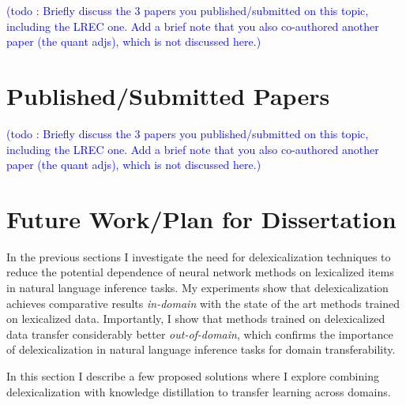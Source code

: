 \documentclass{article}
\newcommand\todo[1]{\textcolor{blue}{(todo : #1)}}
\begin{document}
\todo{Briefly discuss the 3 papers you published/submitted on this topic, including the LREC one. Add a brief note that you also co-authored another paper (the quant adjs), which is not discussed here.}

\section{Published/Submitted Papers}

\todo{Briefly discuss the 3 papers you published/submitted on this topic, including the LREC one. Add a brief note that you also co-authored another paper (the quant adjs), which is not discussed here.}

 
\section{Future Work/Plan for Dissertation}
In the previous sections I investigate the need for delexicalization techniques to reduce the potential dependence of neural network methods on lexicalized items in natural language inference tasks. My experiments show that delexicalization achieves comparative results {\em in-domain} with the state of the art methods trained on lexicalized data. Importantly, I show that methods trained on delexicalized data transfer considerably better {\em out-of-domain}, which  confirms the importance of delexicalization in natural language inference tasks for domain transferability.

In this section I describe a few proposed solutions where I explore combining delexicalization with knowledge distillation to transfer learning across domains.
\end{document}

